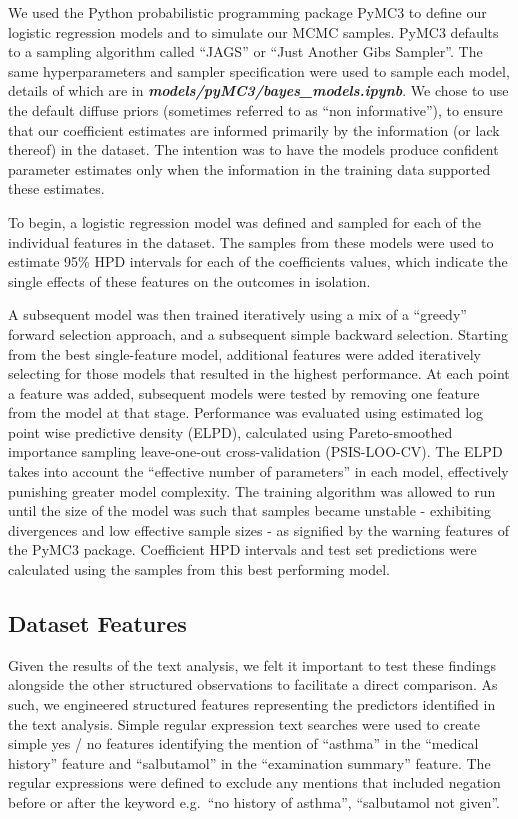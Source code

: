 We used the Python probabilistic programming package PyMC3 to define our logistic regression models and to simulate our MCMC samples. PyMC3 defaults to a sampling algorithm called ``JAGS'' or ``Just Another Gibs Sampler''. The same hyperparameters and sampler specification were used to sample each model, details of which are in \textbf{\textit{models/\-pyMC3/\-bayes\_models.ipynb}}. We chose to use the default diffuse priors (sometimes referred to as ``non informative''), to ensure that our coefficient estimates are informed primarily by the information (or lack thereof) in the dataset. The intention was to have the models produce confident parameter estimates only when the information in the training data supported these estimates.

To begin, a logistic regression model was defined and sampled for each of the individual features in the dataset. The samples from these models were used to estimate 95\% HPD intervals for each of the coefficients values, which indicate the single effects of these features on the outcomes in isolation.

A subsequent model was then trained iteratively using a mix of a ``greedy'' forward selection approach, and a subsequent simple backward selection. Starting from the best single-feature model, additional features were added iteratively selecting for those models that resulted in the highest performance. At each point a feature was added, subsequent models were tested by removing one feature from the model at that stage.  Performance was evaluated using estimated log point wise predictive density (ELPD), calculated using Pareto-smoothed importance sampling leave-one-out cross-validation (PSIS-LOO-CV). The ELPD takes into account the ``effective number of parameters'' in each model, effectively punishing greater model complexity. The training algorithm was allowed to run until the size of the model was such that samples became unstable - exhibiting divergences and low effective sample sizes - as signified by the warning features of the PyMC3 package. Coefficient HPD intervals and test set predictions were calculated using the samples from this best performing model.

\subsection{Dataset Features}\label{subsec:dataset-features}

Given the results of the text analysis, we felt it important to test these findings alongside the other structured observations to facilitate a direct comparison. As such, we engineered structured features representing the predictors identified in the text analysis. Simple regular expression text searches were used to create simple yes / no features identifying the mention of ``asthma'' in the ``medical history'' feature and ``salbutamol'' in the ``examination summary'' feature. The regular expressions were defined to exclude any mentions that included negation before or after the keyword e.g.\ ``no history of asthma'', ``salbutamol not given''.

